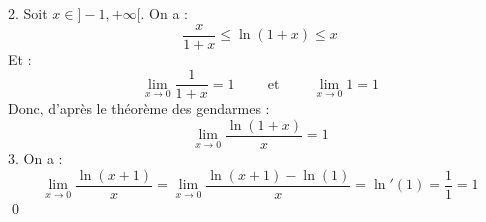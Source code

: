 \documentclass[10pt]{article}
\begin{document}
\begin{tcolorbox}[enhanced, width=7in, center, size=fbox, fontupper=\large, drop shadow southwest]
    2. Soit $x\in]-1,+\infty[$. On a :
    \begin{equation*}
        \frac{x}{1+x}\leq\ln(1+x)\leq x
    \end{equation*}
    Et :
    \begin{equation*}
        \lim_{x\rightarrow0}\frac{1}{1+x}=1 \hspace{1cm} \text{et} \hspace{1cm} \lim_{x\rightarrow0}1=1
    \end{equation*}
    Donc, d'après le théorème des gendarmes :
   \begin{equation*}
        \lim_{x\rightarrow0}\frac{\ln(1+x)}{x}=1
   \end{equation*}
   3.
   On a :
   \begin{equation*}
        \lim_{x\rightarrow0}\frac{\ln(x+1)}{x}=\lim_{x\rightarrow0}\frac{\ln(x+1)-\ln(1)}{x}=\ln'(1)=\frac{1}{1}=1
   \end{equation*}
   \qed
\end{tcolorbox}
\end{document}
